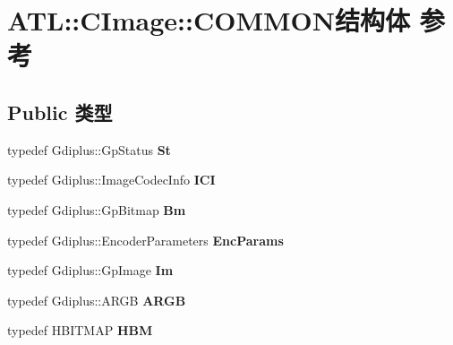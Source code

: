 \hypertarget{struct_a_t_l_1_1_c_image_1_1_c_o_m_m_o_n}{}\section{A\+TL\+:\+:C\+Image\+:\+:C\+O\+M\+M\+O\+N结构体 参考}
\label{struct_a_t_l_1_1_c_image_1_1_c_o_m_m_o_n}
\subsection*{Public 类型}
\begin{DoxyCompactItemize}
\item 
\mbox{\label{struct_a_t_l_1_1_c_image_1_1_c_o_m_m_o_n_a2de76938ffbfa3c3abd95d89cd6f1c14}} 
typedef Gdiplus\+::\+Gp\+Status {\bfseries St}
\item 
\mbox{\label{struct_a_t_l_1_1_c_image_1_1_c_o_m_m_o_n_a2a88dad7e763f5342339940d4e0af120}} 
typedef Gdiplus\+::\+Image\+Codec\+Info {\bfseries I\+CI}
\item 
\mbox{\label{struct_a_t_l_1_1_c_image_1_1_c_o_m_m_o_n_a7f36e33ad1945d0ab2c84a4a5a0bbc18}} 
typedef Gdiplus\+::\+Gp\+Bitmap {\bfseries Bm}
\item 
\mbox{\label{struct_a_t_l_1_1_c_image_1_1_c_o_m_m_o_n_ad16c37b2d90ff0185bccca80ae9dd8ea}} 
typedef Gdiplus\+::\+Encoder\+Parameters {\bfseries Enc\+Params}
\item 
\mbox{\label{struct_a_t_l_1_1_c_image_1_1_c_o_m_m_o_n_aba9b7a0af79b46f70d0b1c3627e3124c}} 
typedef Gdiplus\+::\+Gp\+Image {\bfseries Im}
\item 
\mbox{\label{struct_a_t_l_1_1_c_image_1_1_c_o_m_m_o_n_abc7c9800d5c03c1a4fb0db3a04ff7151}} 
typedef Gdiplus\+::\+A\+R\+GB {\bfseries A\+R\+GB}
\item 
\mbox{\label{struct_a_t_l_1_1_c_image_1_1_c_o_m_m_o_n_a7267a9e47b582768f89b5c17d808882e}} 
typedef H\+B\+I\+T\+M\+AP {\bfseries H\+BM}

\end{DoxyCompactItemize}
